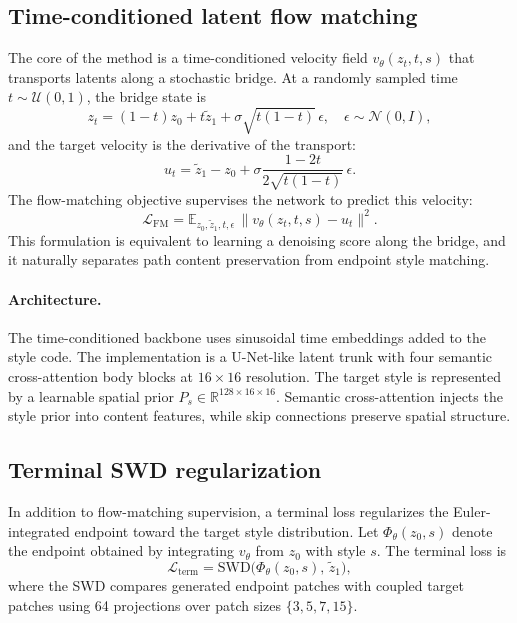 ﻿\documentclass[letterpaper]{article}
\begin{document}
\subsection{Time-conditioned latent flow matching}
The core of the method is a time-conditioned velocity field $v_\theta(z_t,t,s)$ that transports latents along a stochastic bridge. At a randomly sampled time $t\sim\mathcal{U}(0,1)$, the bridge state is
\begin{equation}
    z_t = (1-t)z_0 + t\tilde{z}_1 + \sigma\sqrt{t(1-t)}\,\epsilon,
    \quad \epsilon\sim\mathcal{N}(0,I),
\end{equation}
and the target velocity is the derivative of the transport:
\begin{equation}
    u_t = \tilde{z}_1 - z_0 + \sigma\frac{1-2t}{2\sqrt{t(1-t)}}\,\epsilon .
\end{equation}
The flow-matching objective supervises the network to predict this velocity:
\begin{equation}
    \mathcal{L}_{\mathrm{FM}} = \mathbb{E}_{z_0,\tilde{z}_1,t,\epsilon}\,
    \bigl\|v_\theta(z_t,t,s) - u_t\bigr\|^2 .
\end{equation}
This formulation is equivalent to learning a denoising score along the bridge, and it naturally separates path content preservation from endpoint style matching.

\paragraph{Architecture.}
The time-conditioned backbone uses sinusoidal time embeddings added to the style code. The implementation is a U-Net-like latent trunk with four semantic cross-attention body blocks at $16\times16$ resolution. The target style is represented by a learnable spatial prior $P_s\in\mathbb{R}^{128\times16\times16}$. Semantic cross-attention injects the style prior into content features, while skip connections preserve spatial structure.

\subsection{Terminal SWD regularization}
In addition to flow-matching supervision, a terminal loss regularizes the Euler-integrated endpoint toward the target style distribution. Let $\Phi_\theta(z_0,s)$ denote the endpoint obtained by integrating $v_\theta$ from $z_0$ with style $s$. The terminal loss is
\begin{equation}
    \mathcal{L}_{\mathrm{term}} = \mathrm{SWD}\bigl(\Phi_\theta(z_0,s),\,\tilde{z}_1\bigr),
\end{equation}
where the SWD compares generated endpoint patches with coupled target patches using 64 projections over patch sizes $\{3,5,7,15\}$.
\end{document}
